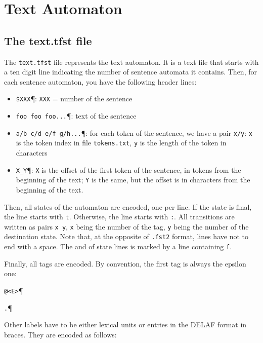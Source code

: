 \section{Text Automaton}

\subsection{The text.tfst file}
\label{section-tfst-format}
The \verb+text.tfst+ file represents the text automaton. It is a text
file that starts with a ten digit line indicating the number of sentence
automata it contains. Then, for each sentence automaton, you have the following
header lines:

\begin{itemize}
    \item \verb+$XXX+\P : \verb+XXX+ = number of the sentence

    \item \verb+foo foo foo...+\P : text of the sentence

    \item \verb+a/b c/d e/f g/h...+\P : for each token of the sentence, we
    have a pair \verb+x/y+: \verb+x+ is the token index in file
    \verb+tokens.txt+, \verb+y+ is the length of the token in characters

    \item \verb+X_Y+\P : \verb+X+ is the offset of the first token of the
    sentence, in tokens from the beginning of the text; \verb+Y+ is the same,
    but the offset is in characters from the beginning of the text.
\end{itemize}


\bigskip
\noindent Then, all states of the automaton are encoded, one per line. If the
state is final, the line starts with \verb+t+. Otherwise, the line starts with
\verb+:+. All transitions are written as pairs \verb+x y+, \verb+x+ being the
number of the tag, \verb+y+ being the number of the destination state. Note
that, at the opposite of \verb+.fst2+ format, lines have not to end with a
space. The and of state lines is marked by a line containing \verb+f+. 

\bigskip
\noindent Finally, all tags are encoded. By convention, the first tag is always
the epsilon one:

\bigskip
\noindent \verb$@<E>$\P

\noindent \verb$.$\P


\bigskip
\noindent Other labels have to be either lexical units or entries in the DELAF
format in braces. They are encoded as follows:

